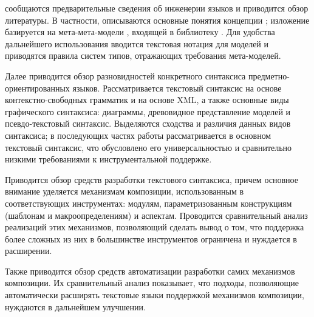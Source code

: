  сообщаются предварительные сведения об инженерии языков и приводится обзор литературы. В частности, описываются основные понятия концепции ; изложение базируется на мета-мета-модели , входящей в библиотеку . Для удобства дальнейшего использования вводится текстовая нотация для моделей и приводятся правила систем типов, отражающих требования мета-моделей.

Далее приводится обзор разновидностей конкретного синтаксиса предметно-ориентированных языков. Рассматривается текстовый синтаксис на основе контекстно-свободных грамматик и на основе XML, а также основные виды графического синтаксиса: диаграммы, древовидное представление моделей и псевдо-текстовый синтаксис. Выделяются сходства и различия данных видов синтаксиса; в последующих частях работы рассматривается в основном текстовый синтаксис, что обусловлено его универсальностью и сравнительно низкими требованиями к инструментальной поддержке.

Приводится обзор средств разработки текстового синтаксиса, причем основное внимание уделяется механизмам композиции, использованным в соответствующих инструментах: модулям, параметризованным конструкциям (шаблонам и макроопределениям) и аспектам. Проводится сравнительный анализ реализаций этих механизмов, позволяющий сделать вывод о том, что поддержка более сложных из них в большинстве инструментов ограничена и нуждается в расширении.

Также приводится обзор средств автоматизации разработки самих механизмов композиции. Их сравнительный анализ показывает, что подходы, позволяющие автоматически расширять текстовые языки поддержкой механизмов композиции, нуждаются в дальнейшем улучшении.